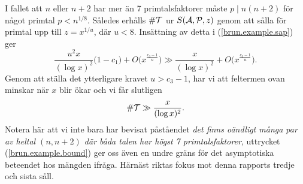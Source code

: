 I fallet att $n$ eller $n+2$ har mer än 7 primtalsfaktorer måste $p\mid n(n+2)$ för något primtal $p < n^{1/8}$.
Således erhålls $\card\mathcal{T}$ ur $\S{A}{P}{z}$ genom att sålla för primtal upp till $z = x^{1/u}$, där $u<8$.
Insättning av detta i (\ref{brun.example.sap}) ger
\begin{equation*}
    \frac{u^2x}{(\log x)^2}\bigl(1 - c_1\bigr) + O\bigl(x^{\frac{c_3 - 1}{u}}\bigr) \gg 
    \frac{x}{(\log x)^2} + O\bigl(x^{\frac{c_3 - 1}{u}}\bigr).
\end{equation*}
Genom att ställa det ytterligare kravet $u>c_3-1$, har vi att feltermen ovan minskar när $x$ blir ökar och vi får slutligen
\begin{equation} \label{brun.example.bound}
    \card\mathcal{T} \gg \frac{x}{(\log x)^2}.
\end{equation}
Notera här att vi inte bara har bevisat påståendet \textit{det finns oändligt många par av heltal $(n,n+2)$ där båda talen har högst 7 primtalsfaktorer},
uttrycket (\ref{brun.example.bound}) ger oss även en undre gräns för det asymptotiska beteendet hos mängden ifråga.
Härnäst riktas fokus mot denna rapports tredje och sista såll.